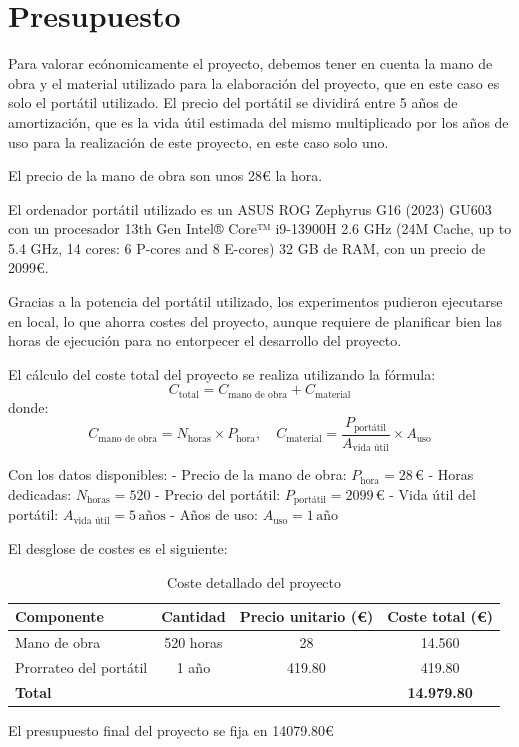 \newpage

\section{Presupuesto}

Para valorar ecónomicamente el proyecto, debemos tener en cuenta la mano de obra y el material utilizado para la elaboración del proyecto, que en este caso es solo el portátil utilizado. El precio del portátil se dividirá entre 5 años de amortización, que es la vida útil estimada del mismo multiplicado por los años de uso para la realización de este proyecto, en este caso solo uno.

El precio de la mano de obra son unos 28€ la hora.

El ordenador portátil utilizado es un ASUS ROG Zephyrus G16 (2023) GU603 con un procesador 13th Gen Intel® Core™ i9-13900H 2.6 GHz (24M  Cache, up to 5.4 GHz, 14 cores: 6 P-cores and 8 E-cores) 32 GB de RAM, con un precio de 2099€. 

Gracias a la potencia del portátil utilizado, los experimentos pudieron ejecutarse en local, lo que ahorra costes del proyecto, aunque requiere de planificar bien las horas de ejecución para no entorpecer el desarrollo del proyecto.

El cálculo del coste total del proyecto se realiza utilizando la fórmula:
\[
C_{\text{total}} = C_{\text{mano de obra}} + C_{\text{material}}
\]
donde:
\[
C_{\text{mano de obra}} = N_{\text{horas}} \times P_{\text{hora}}, \quad 
C_{\text{material}} = \frac{P_{\text{portátil}}}{A_{\text{vida útil}}} \times A_{\text{uso}}
\]

Con los datos disponibles:
- Precio de la mano de obra: \( P_{\text{hora}} = 28 \, \text{€} \)
- Horas dedicadas: \( N_{\text{horas}} = 520 \)
- Precio del portátil: \( P_{\text{portátil}} = 2099 \, \text{€} \)
- Vida útil del portátil: \( A_{\text{vida útil}} = 5 \, \text{años} \)
- Años de uso: \( A_{\text{uso}} = 1 \, \text{año} \)

El desglose de costes es el siguiente:

\begin{table}[ht]
\centering
\caption{Coste detallado del proyecto}
\label{coste_proyecto}
\begin{tabular}{|l|c|c|c|}
\hline
\textbf{Componente} & \textbf{Cantidad} & \textbf{Precio unitario (€)} & \textbf{Coste total (€)} \\ \hline
Mano de obra & 520 horas & 28 & 14.560 \\ \hline
Prorrateo del portátil & 1 año & 419.80 & 419.80 \\ \hline
\textbf{Total} & & & \textbf{14.979.80} \\ \hline
\end{tabular}
\end{table}

El presupuesto final del proyecto se fija en 14079.80€

\endinput
